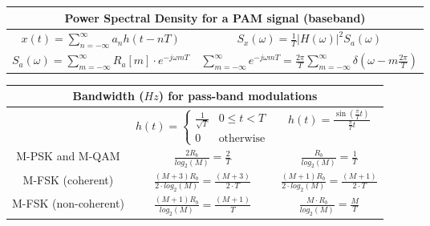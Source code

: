 \documentclass[en]{article}
\DeclareMathOperator{\sen}{sin}
\begin{document}
\begin{center}
       

    \renewcommand{\arraystretch}{2}
        \begin{tabular}{|c|c|}
            \multicolumn{2}{c}{{\bf Power Spectral Density for a PAM signal (baseband)}}\\
            \hline
            $x(t) = \displaystyle\sum\limits_{n=-\infty}^{\infty} a_n h(t-nT)$ &
            $S_x(\omega) = \displaystyle\frac{1}{T} |H(\omega)|^2 S_a(\omega)$\\
            \hline
            $S_a(\omega) = \displaystyle\sum\limits_{m=-\infty}^{\infty} R_a[m] \cdot e^{-j\omega m T}$ &
            $\sum\limits_{m=-\infty}^\infty e^{-j\omega mT} = \frac{2\pi}{T} \sum\limits_{m=-\infty}^\infty \delta (\omega- m\frac{2\pi}{T} )$\\
            \hline

        \end{tabular}
    \renewcommand{\arraystretch}{1}
        \vspace{0.5cm}

        \renewcommand{\arraystretch}{2}
        \begin{tabular}{|c|c|c|}
            \multicolumn{3}{c}{{\bf Bandwidth ($Hz$) for pass-band modulations}} \\
            \hline
             & $ h(t) = \left \{ \begin{array}{lc} \displaystyle\frac{1}{\sqrt{T}} & 0\leq t < T \\ 0 & \text{otherwise} \end{array}\right. $ & $ h(t) = \displaystyle\frac{\sen\left ( \displaystyle\frac{\pi}{T} t \right ) }{\displaystyle\frac{\pi}{T}t}$ \\
            \hline
            M-PSK and M-QAM & $\displaystyle\frac{2 R_b}{log_2(M)} = \displaystyle\frac{2}{T}$ & $\displaystyle\frac{R_b}{log_2(M)} = \displaystyle\frac{1}{T}$ \\[1ex]
            \hline
            M-FSK (coherent) & $\displaystyle\frac{(M+3) R_b}{2 \cdot log_2(M)} = \displaystyle\frac{(M+3)}{2\cdot T}$ & $\displaystyle\frac{(M+1) R_b}{2 \cdot log_2(M)} = \displaystyle\frac{(M+1)}{2\cdot T}$ \\[1ex]
            \hline
            M-FSK (non-coherent) & $\displaystyle\frac{(M+1) R_b}{log_2(M)} = \displaystyle\frac{(M+1)}{T}$ & $\displaystyle\frac{M \cdot R_b}{log_2(M)} = \displaystyle\frac{M}{T}$ \\[1ex]
            \hline
            

\end{tabular}
\end{center}
\end{document}
